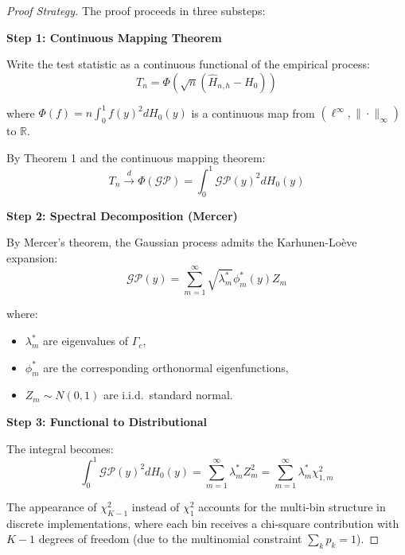 \documentclass[12pt]{article}
\theoremstyle{plain}
\theoremstyle{definition}
\newcommand{\dto}{\xrightarrow{d}}
\newcommand{\1}[1]{\mathbf{1}_{#1}}
\begin{document}
\begin{proof}[Proof Strategy]
The proof proceeds in three substeps:

\medskip

\noindent \textbf{Step 1: Continuous Mapping Theorem}

Write the test statistic as a continuous functional of the empirical process:
\begin{equation}
T_n = \Phi(\sqrt{n}(\widehat{H}_{n,h} - H_0))
\end{equation}

where $\Phi(f) = n \int_0^1 f(y)^2 dH_0(y)$ is a continuous map from $(\ell^\infty, \|\cdot\|_\infty)$ to $\mathbb{R}$.

By Theorem 1 and the continuous mapping theorem:
\begin{equation}
T_n \dto \Phi(\mathcal{GP}) = \int_0^1 \mathcal{GP}(y)^2 dH_0(y)
\end{equation}

\medskip

\noindent \textbf{Step 2: Spectral Decomposition (Mercer)}

By Mercer's theorem, the Gaussian process admits the Karhunen-Loève expansion:
\begin{equation}
\mathcal{GP}(y) = \sum_{m=1}^\infty \sqrt{\lambda_m^*} \phi_m^*(y) Z_m
\end{equation}

where:
\begin{itemize}
\item $\lambda_m^*$ are eigenvalues of $\Gamma_c$,
\item $\phi_m^*$ are the corresponding orthonormal eigenfunctions,
\item $Z_m \sim N(0,1)$ are i.i.d.\ standard normal.
\end{itemize}

\medskip

\noindent \textbf{Step 3: Functional to Distributional}

The integral becomes:
\begin{equation}
\int_0^1 \mathcal{GP}(y)^2 dH_0(y) = \sum_{m=1}^\infty \lambda_m^* Z_m^2 = \sum_{m=1}^\infty \lambda_m^* \chi^2_{1,m}
\end{equation}

The appearance of $\chi^2_{K-1}$ instead of $\chi^2_1$ accounts for the multi-bin structure in discrete implementations, where each bin receives a chi-square contribution with $K-1$ degrees of freedom (due to the multinomial constraint $\sum_k p_k = 1$).

\end{proof}
\end{document}
